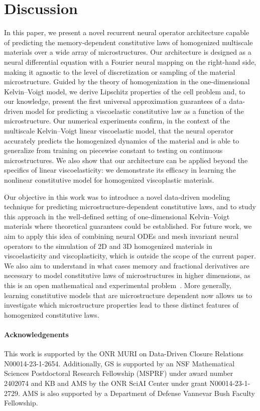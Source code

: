 \documentclass[letterpaper,11pt]{article}
\begin{document}
\section{Discussion}
In this paper, we present a novel recurrent neural operator architecture capable of predicting the memory-dependent constitutive laws of homogenized multiscale materials over a wide array of microstructures. Our architecture is designed as a neural differential equation with a Fourier neural mapping on the right-hand side, making it agnostic to the level of discretization or sampling of the material microstructure. Guided by the theory of homogenization in the one-dimensional Kelvin--Voigt model, we derive Lipschitz properties of the cell problem and, to our knowledge, present the first universal approximation guarantees of a data-driven model for predicting a viscoelastic constitutive law as a function of the microstructure. Our numerical experiments confirm, in the context of the multiscale Kelvin--Voigt linear viscoelastic model, that the neural operator accurately predicts the homogenized dynamics of the material and is able to generalize from training on piecewise constant to testing on continuous microstructures. We also show that our architecture can be applied beyond the specifics of linear viscoelasticity: we demonstrate its efficacy in learning the nonlinear constitutive model for homogenized viscoplastic materials.

Our objective in this work was to introduce a novel data-driven modeling technique for predicting microstructure-dependent constitutive laws, and to study this approach in the well-defined setting of one-dimensional Kelvin--Voigt materials where theoretical guarantees could be established. For future work, we aim to apply this idea of combining neural ODEs and mesh invariant neural operators to the simulation of 2D and 3D homogenized materials in viscoelasticity and viscoplasticity, which is outside the scope of the current paper. We also aim to understand in what cases memory and fractional derivatives are necessary to model constitutive laws of microstructures in higher dimensions, as this is an open mathematical and experimental problem~\cite{ostoja2018does}. More generally, learning constitutive models that are microstructure dependent now allows us to investigate which microstructure properties lead to these distinct features of homogenized constitutive laws.


\paragraph{Acknowledgenents}
This work is supported by the ONR MURI on Data-Driven Closure Relations N00014-23-1-2654. Additionally, GS is supported by an NSF Mathematical Sciences Postdoctoral Research Fellowship (MSPRF) under award number 2402074 and KB and AMS by the ONR SciAI Center under grant N00014-23-1-2729. AMS is also supported by a Department of Defense Vannevar Bush Faculty Fellowship.
\end{document}
